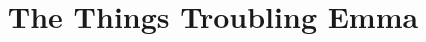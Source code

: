 \documentclass[11pt]{article}
\begin{document}
\ttfamily
\title{The Things Troubling Emma}
\maketitle
\end{document}
